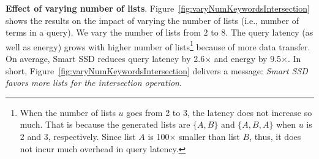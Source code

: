 






\textbf{Effect of varying number of lists}.
Figure~\ref{fig:varyNumKeywordsIntersection} shows the results on the impact of varying the number of lists (i.e., number of terms in a query). %
We vary the number of lists from 2 to 8.
The query latency (as well as energy) grows with higher number of lists\footnote{\small When the number of lists $u$ goes from 2 to 3, the latency does not increase so much. That is because the generated lists are $\{A, B\}$ and $\{A, B, A\}$ when $u$ is 2 and 3, respectively. Since list $A$ is 100$\times$ smaller than list $B$, thus, it does not incur much overhead in query latency.} because of more data transfer.
On average, Smart SSD reduces query latency by 2.6$\times$ and energy by 9.5$\times$.
In short, Figure~\ref{fig:varyNumKeywordsIntersection} delivers a message: \emph{Smart SSD favors more lists for the \textsf{intersection} operation}.

